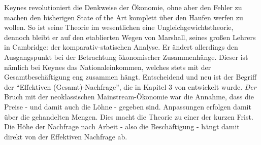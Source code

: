 Keynes revolutioniert die Denkweise der Ökonomie, ohne aber den Fehler zu machen den bisherigen State of the Art komplett über den Haufen werfen zu wollen. So ist seine Theorie im wesentlichen eine Ungleichgewichtstheorie, dennoch bleibt er auf den etablierten Wegen von Marshall, seines großen Lehrers in Cambridge: der komparativ-statischen Analyse. Er ändert allerdings den Ausgangspunkt bei der Betrachtung ökonomischer Zusammenhänge. Dieser ist nämlich bei Keynes das Nationaleinkommen, welches stets mit der Gesamtbeschäftigung eng zusammen hängt. Entscheidend und neu ist der Begriff der "`Effektiven (Gesamt)-Nachfrage"', die in Kapitel 3 von \textcite{Keynes1936} entwickelt wurde. \textit{Der} Bruch mit der neoklassischen Mainstream-Ökonomie war die Annahme, dass die Preise - und damit auch die Löhne - gegeben sind\parencite[S. 58]{Snowdon2005}. Anpassungen erfolgen damit über die gehandelten Mengen. Dies macht die Theorie zu einer der kurzen Frist. Die Höhe der Nachfrage nach Arbeit - also die Beschäftigung - hängt damit direkt von der Effektiven Nachfrage ab.

